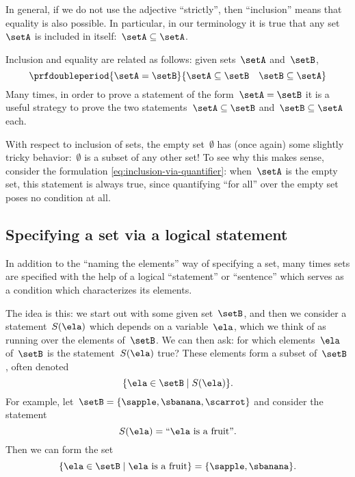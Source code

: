 In general, if we do not use the adjective ``strictly'', then ``inclusion'' means that equality is also possible.
In particular, in our terminology it is true that any set~$\setA$ is included in itself:~$\setA \subseteq \setA$.

Inclusion and equality are related as follows: given sets~$\setA$ and~$\setB$,
%
\begin{equation*}
    \prfdoubleperiod{
        \setA = \setB
    }{
        {\setA \subseteq \setB}
        \quad
        {\setB \subseteq \setA}
    }
\end{equation*}
%
Many times, in order to prove a statement of the form~$\setA = \setB$ it is a useful strategy to prove the two statements~$\setA \subseteq \setB$ and~$\setB \subseteq \setA$ each.

With respect to inclusion of sets, the empty set~$\emptyset$ has (once again) some slightly tricky behavior:~$\emptyset$ is a subset of any other set!
To see why this makes sense, consider the formulation \cref{eq:inclusion-via-quantifier}: when~$\setA$ is the empty set, this statement is always true, since quantifying ``for all'' over the empty set poses no condition at all.

\subsection{Specifying a set via a logical statement}

In addition to the ``naming the elements'' way of specifying a set, many times sets are specified with the help of a logical ``statement'' or ``sentence'' which serves as a condition which characterizes its elements.

The idea is this: we start out with some given set~$\setB$, and then we consider a statement~$S(\ela)$ which depends on a variable~$\ela$, which we think of as running over the elements of~$\setB$.
We can then ask: for which elements~$\ela$ of~$\setB$ is the statement~$S(\ela)$ true?
These elements form a subset of~$\setB$, often denoted
%
\begin{equation}
    \label{eq:axiom-specialization}
    \{ \ela \in \setB \mid S(\ela) \}.
\end{equation}
%
For example, let~$\setB = \{ \sapple, \sbanana, \scarrot \}$ and consider the statement
%
\begin{equation*}
    S(\ela) = \text{``$\ela$ is a fruit''}.
\end{equation*}
%
Then we can form the set
%
\begin{equation*}
    \{ \ela \in \setB \mid \ela \text{ is a fruit} \} = \{ \sapple, \sbanana \}.
\end{equation*}

